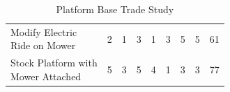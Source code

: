 \documentclass{article}
\begin{document}
\begin{table}[H]
\begin{adjustwidth}{-1.5in}{-1.5in}
\begin{tabular}{|l|c|c|c|c|c|c|c|c|}
		\makecell[l]{Modify Electric \\ Ride on Mower}      & 2                   & 1              & 3                    & 1                              & 3    & 5        & 5        & 61    \\ \hdashline
		\makecell[l]{Stock Platform with \\ Mower Attached} & 5                   & 3              & 5                    & 4                              & 1    & 3        & 3        & 77    \\ \hline
		\end{tabular}
		\caption{Platform Base Trade Study}
		\label{my-label}
		\end{adjustwidth}
		\end{table}
		
		
\end{document}
